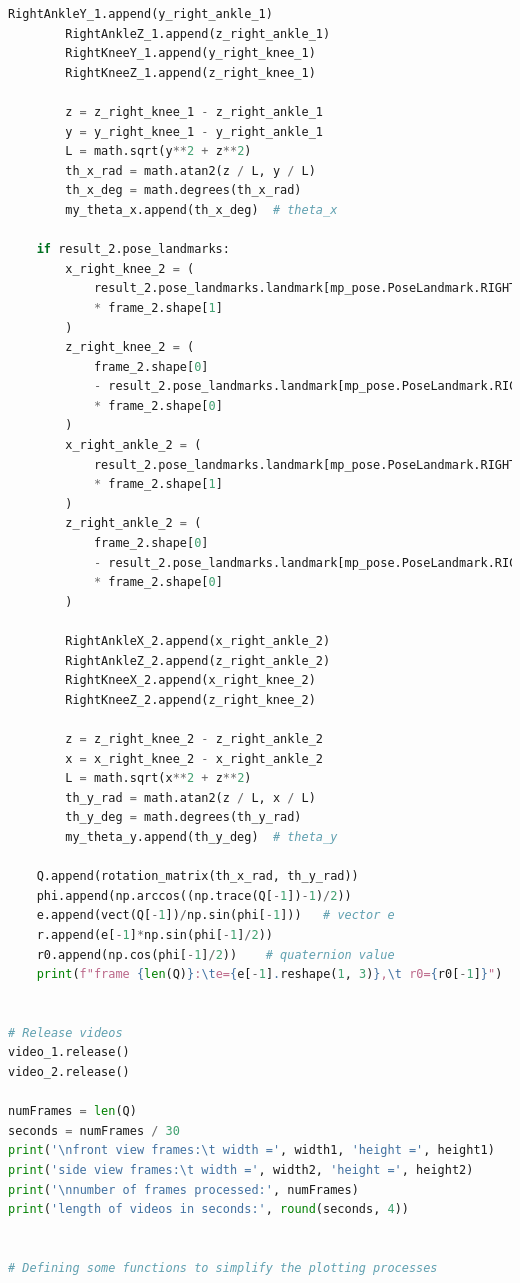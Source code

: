 \documentclass[conference]{IEEEtran}
\begin{document}
\begin{lstlisting}[language=Python]
        RightAnkleY_1.append(y_right_ankle_1)
        RightAnkleZ_1.append(z_right_ankle_1)
        RightKneeY_1.append(y_right_knee_1)
        RightKneeZ_1.append(z_right_knee_1)

        z = z_right_knee_1 - z_right_ankle_1
        y = y_right_knee_1 - y_right_ankle_1
        L = math.sqrt(y**2 + z**2)
        th_x_rad = math.atan2(z / L, y / L)
        th_x_deg = math.degrees(th_x_rad)
        my_theta_x.append(th_x_deg)  # theta_x

    if result_2.pose_landmarks:
        x_right_knee_2 = (
            result_2.pose_landmarks.landmark[mp_pose.PoseLandmark.RIGHT_KNEE].x
            * frame_2.shape[1]
        )
        z_right_knee_2 = (
            frame_2.shape[0]
            - result_2.pose_landmarks.landmark[mp_pose.PoseLandmark.RIGHT_KNEE].y
            * frame_2.shape[0]
        )
        x_right_ankle_2 = (
            result_2.pose_landmarks.landmark[mp_pose.PoseLandmark.RIGHT_ANKLE].x
            * frame_2.shape[1]
        )
        z_right_ankle_2 = (
            frame_2.shape[0]
            - result_2.pose_landmarks.landmark[mp_pose.PoseLandmark.RIGHT_ANKLE].y
            * frame_2.shape[0]
        )

        RightAnkleX_2.append(x_right_ankle_2)
        RightAnkleZ_2.append(z_right_ankle_2)
        RightKneeX_2.append(x_right_knee_2)
        RightKneeZ_2.append(z_right_knee_2)

        z = z_right_knee_2 - z_right_ankle_2
        x = x_right_knee_2 - x_right_ankle_2
        L = math.sqrt(x**2 + z**2)
        th_y_rad = math.atan2(z / L, x / L)
        th_y_deg = math.degrees(th_y_rad)
        my_theta_y.append(th_y_deg)  # theta_y

    Q.append(rotation_matrix(th_x_rad, th_y_rad))
    phi.append(np.arccos((np.trace(Q[-1])-1)/2))
    e.append(vect(Q[-1])/np.sin(phi[-1]))   # vector e
    r.append(e[-1]*np.sin(phi[-1]/2))
    r0.append(np.cos(phi[-1]/2))    # quaternion value
    print(f"frame {len(Q)}:\te={e[-1].reshape(1, 3)},\t r0={r0[-1]}")


# Release videos
video_1.release()
video_2.release()

numFrames = len(Q)
seconds = numFrames / 30
print('\nfront view frames:\t width =', width1, 'height =', height1)
print('side view frames:\t width =', width2, 'height =', height2)
print('\nnumber of frames processed:', numFrames)
print('length of videos in seconds:', round(seconds, 4))


# Defining some functions to simplify the plotting processes


\end{lstlisting}
\end{document}
